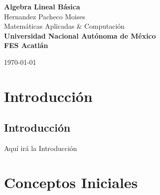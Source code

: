 \documentclass[a4paper,12pt]{report} %
\begin{document}
\begin{titlepage}
    \pagecolor{MidnightBlue}
    \color{white}
    \centering
    {\Huge \textbf{Algebra Lineal Básica}} \\[2.5cm] %
    {\Large Hernandez Pacheco Moises} \\[7cm]       %
    \color{SkyBlue}
    {\Large Matemáticas Aplicadas \& Computación} \\[1cm]
    \color{white}
    \textbf{\large Universidad Nacional Autónoma de México} \\[0.5cm]   %
    \textbf{\large FES Acatlán} \\[1cm]   %
    \vfill
    
    \vfill
    {\large \today}                              %
\end{titlepage}

\restoregeometry %

\pagecolor{white}
\color{black}
\hypertarget{toc}{} %
\tableofcontents %

\newpage
\renewcommand{\thechapter}{\Roman{chapter}}
\part{Introducción}
\renewcommand{\thechapter}{\arabic{chapter}}
\chapter{Introducción}
Aquí irá la Introducción

\newpage
\renewcommand{\thechapter}{\Roman{chapter}}
\part{Conceptos Iniciales}
\renewcommand{\thechapter}{\arabic{chapter}}
\end{document}
